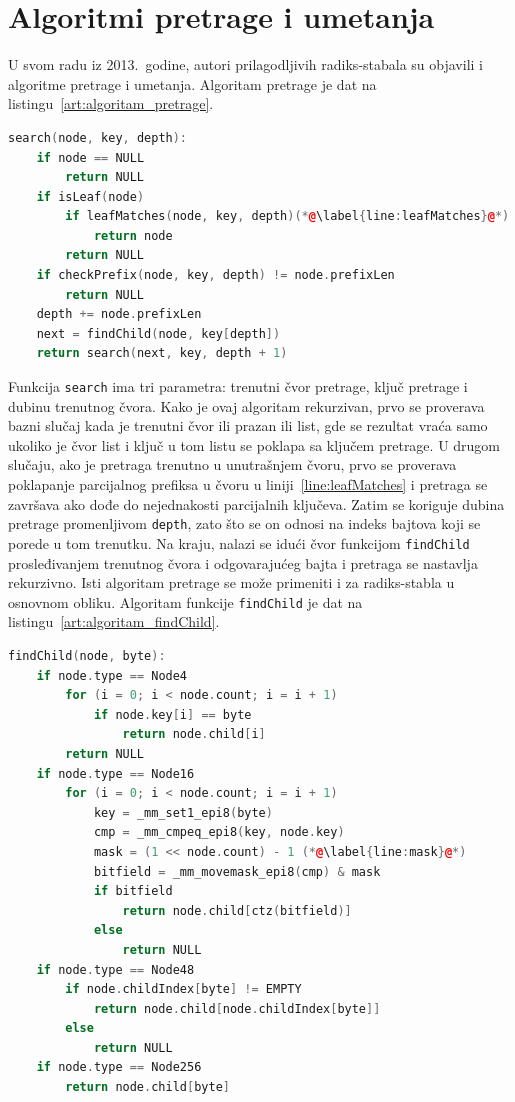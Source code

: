 \documentclass[12pt,oneside]{memoir}
\begin{document}
\section{Algoritmi pretrage i umetanja}

U svom radu iz 2013.\ godine, autori prilagodljivih radiks-stabala su
objavili i algoritme pretrage i umetanja. Algoritam pretrage je dat na
listingu~\ref{art:algoritam_pretrage}.

\begin{lstlisting}[language=C++,
                   caption={Algoritam pretrage strukture podataka ART},
                   label={art:algoritam_pretrage}]
search(node, key, depth):
    if node == NULL
        return NULL
    if isLeaf(node)
        if leafMatches(node, key, depth)(*@\label{line:leafMatches}@*)
            return node
        return NULL
    if checkPrefix(node, key, depth) != node.prefixLen
        return NULL
    depth += node.prefixLen
    next = findChild(node, key[depth])
    return search(next, key, depth + 1)
\end{lstlisting}

Funkcija \texttt{search} ima tri parametra: trenutni čvor pretrage, ključ
pretrage i dubinu trenutnog čvora. Kako je ovaj algoritam rekurzivan,
prvo se proverava bazni slučaj kada je trenutni čvor ili prazan ili
list, gde se rezultat vraća samo ukoliko je čvor list i ključ u tom listu
se poklapa sa ključem pretrage. U drugom slučaju, ako je pretraga trenutno
u unutrašnjem čvoru, prvo se proverava poklapanje parcijalnog prefiksa
u čvoru u liniji~\ref{line:leafMatches} i pretraga se završava ako dođe
do nejednakosti parcijalnih ključeva. Zatim se koriguje dubina pretrage
promenljivom \texttt{depth},
zato što se on odnosi na indeks bajtova koji se
porede u tom trenutku.
Na kraju, nalazi se idući čvor funkcijom \texttt{findChild} prosleđivanjem
trenutnog čvora i odgovarajućeg bajta i pretraga se
nastavlja rekurzivno. Isti algoritam pretrage se može primeniti i za
radiks-stabla u osnovnom obliku. Algoritam funkcije
\texttt{findChild} je dat na listingu~\ref{art:algoritam_findChild}.

\begin{lstlisting}[language=C++,
                   caption={Algoritam pronalaska idućeg čvora pretrage},
                   label={art:algoritam_findChild}]
findChild(node, byte):
    if node.type == Node4
        for (i = 0; i < node.count; i = i + 1)
            if node.key[i] == byte
                return node.child[i]
        return NULL
    if node.type == Node16
        for (i = 0; i < node.count; i = i + 1)
            key = _mm_set1_epi8(byte)
            cmp = _mm_cmpeq_epi8(key, node.key)
            mask = (1 << node.count) - 1 (*@\label{line:mask}@*)
            bitfield = _mm_movemask_epi8(cmp) & mask
            if bitfield
                return node.child[ctz(bitfield)]
            else
                return NULL
    if node.type == Node48
        if node.childIndex[byte] != EMPTY
            return node.child[node.childIndex[byte]]
        else
            return NULL
    if node.type == Node256
        return node.child[byte]
\end{lstlisting}
\end{document}

